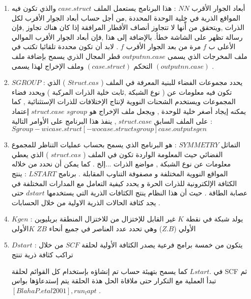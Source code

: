 \begin{enumerate}
	\item 
	أبعاد الجوار الأقرب	$ NN $ : هذا البرنامج يستعمل الملف	$ case.struct $ والذي تكون فيه المواقع الذرية في خلية الوحدة المحددة ,من أجل حساب أبعاد الجوار الأقرب لكل الذرات ,ويتحقق من أّنها لا تتجاوز أنصاف الأقطار المرافقة إذا كان هناك تجاوز ,فإن رسالة تظهر على الشاشة خطأ. بالإضافة إلى هذا ,فإن أبعاد الجوار الأقرب الموالي الأعلى ب $ f $ مرة من بعد الجوار الأقرب $ f $ . لابد أن تكون محددة تلقائيا تكتب في ملف المخرجات الذي يسمى  $ outputnn.case  $ قطر المجال الذري يسمح بإضافة ملف التحكم $ ( case.struct ) $ وملف الإخراج لهذا يسمى  $ (outputnn.case) $ .
	\item 
	$ SGROUP $  :  
	يحدد مجموعات الفضاء للبنية المعرفة في الملف ( $ Struct. cas $ ) الذي تكون فيه معلومات عن ( نوع الشبكة ,ثابت خلية الذرات المركبة ) ويحدد فضاء المجموعات ويستخدم الشحنات النووية لإنتاج الإختلافات للذرات الإستثنائية , 
	كما يمكنه إيجاد أصغر خلية للوحدة , ويجعل ملف الإخراج هو $ sgroup $ $ struct.case  $ إعتماد على الملف السابق $ struct.case  $ , ينفذ هذا البرنامج على الأوامر التالية :
$ 	Sgroup -wi case.struct [-wo case.struct sgroup] case.outputsgen $
	\item 
	التماثل $ SYMMETRY $ : هو البرنامج الذي يسمح بحساب عمليات التناظر للمجموع الفضائي حيث المعلومة الواردة تكون في الملف ( $ struct.cas $ ) الذي يعطي معلومات عن نوع الشبكة , مواضع الذرات ...إلخ . كما يمكن أن نحدد من 
	خلاله المواقع النووية المختلفة و مصفوفة التناوب المقابلة .
	برنامج $ LSTART $ :  ينتج الكثافة الإلكترونية للذرات الحرة و يحدد كيفية التعامل مع المدارات المختلفة  في عصابة الطاقة . 
	حيث أن هذا النظام ينتج الكثافات الذرية التي يستخدمها $ dstart  $ حتى يجد كثافة الحالات الذرية الاولية من خلال الحسابات .
	\item 
	$ Kgen $ : يولد شبكة في نقطة $ K $ غير القابل للإختزال من للاختزال المنطقة بريليوين الأولي ($ Z.B $) وهي تحدد عدد العناصر في جميع أنحاء $ ZB $ $ K $الأولى
	\item 
	$ Dstart $ : يتكون من خمسة برامج فرعية يصدر الكثافة الأولية لحلقة $ SCF $ من خلال تراكب كثافة ذرية تنتج
	
	في $ Lstart. $ كما يسمح بتهيئة حساب تم إنشاؤه بإستخدام كل القوائم لحلقة SCF ثم تبدأ العملية مع التكرار حتى ملاقاة
	الحل هذة الحلقة يتم إستدعاؤها بواس   $ [Blaha P. et al 2001], run_lapt  $ .

\end{enumerate}

